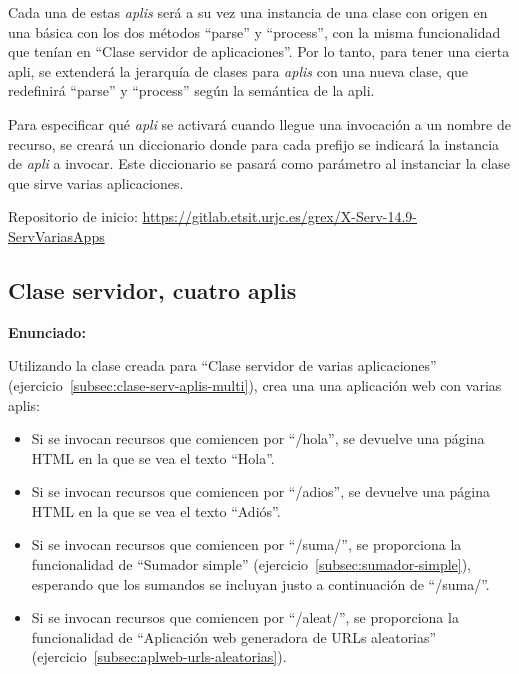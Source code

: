 Cada una de estas \emph{aplis} será a su vez una instancia de una clase con origen en una básica con los dos métodos ``parse'' y ``process'', con la misma funcionalidad que tenían en ``Clase servidor de aplicaciones''. Por lo tanto, para tener una cierta apli, se extenderá la jerarquía de clases para \emph{aplis} con una nueva clase, que redefinirá ``parse'' y ``process'' según la semántica de la apli.

Para especificar qué \emph{apli} se activará cuando llegue una invocación a un nombre de recurso, se creará un diccionario donde para cada prefijo se indicará la instancia de \emph{apli} a invocar. Este diccionario se pasará como parámetro al instanciar la clase que sirve varias aplicaciones.

Repositorio de inicio: \url{https://gitlab.etsit.urjc.es/grex/X-Serv-14.9-ServVariasApps}

\subsection{Clase servidor, cuatro aplis}
\label{subsec:clase-serv-aplis-varias}

\textbf{Enunciado:}

Utilizando la clase creada para ``Clase servidor de varias aplicaciones'' (ejercicio~\ref{subsec:clase-serv-aplis-multi}), crea una una aplicación web con varias aplis:

\begin{itemize}
\item Si se invocan recursos que comiencen por ``/hola'', se devuelve una página HTML en la que se vea el texto ``Hola''.
\item Si se invocan recursos que comiencen por ``/adios'', se devuelve una página HTML en la que se vea el texto ``Adiós''.
\item Si se invocan recursos que comiencen por ``/suma/'', se proporciona la funcionalidad de ``Sumador simple'' (ejercicio~\ref{subsec:sumador-simple}), esperando que los sumandos se incluyan justo a continuación de ``/suma/''.
\item Si se invocan recursos que comiencen por ``/aleat/'', se proporciona la funcionalidad de ``Aplicación web generadora de URLs aleatorias'' (ejercicio~\ref{subsec:aplweb-urls-aleatorias}).
\end{itemize}

